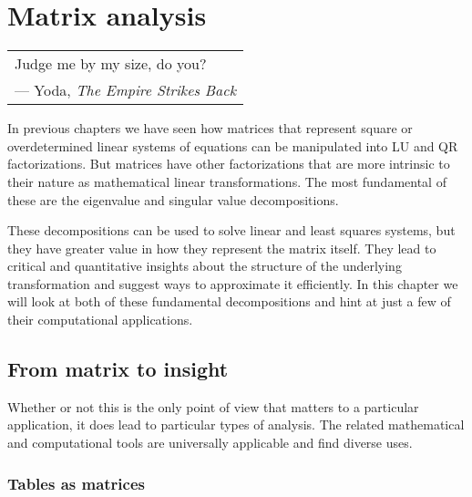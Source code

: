 \chapter{Matrix analysis}
\label{cha:matrixanaly}

\graphicspath{{matrixanaly/figures/}{matrixanaly/examples/}}

\begin{flushright}
  \small \sf
  \begin{tabular}{p{3in}}

    Judge me by my size, do you?\\ \hfill --- Yoda, \textit{The Empire Strikes Back} \index{Yoda} \index{The Empire Strikes Back}
  \end{tabular}
\end{flushright}


In previous chapters we have seen how matrices that represent square or overdetermined linear systems of equations can be manipulated into LU and QR factorizations. But matrices have other factorizations that are more intrinsic to their nature as mathematical linear transformations. The most fundamental of these are the eigenvalue and singular value decompositions.

These decompositions can be used to solve linear and least squares systems, but they have greater value in how they represent the matrix itself. They lead to critical and quantitative insights about the structure of the underlying transformation and suggest ways to approximate it efficiently. In this chapter we will look at both of these fundamental decompositions and hint at just a few of their computational applications.

\newpage

\section{From matrix to insight}
\label{sec:matrix-insight}

 Whether or not this is the only point of view that matters to a particular application, it does lead to particular types of analysis. The related mathematical and computational tools are universally applicable and find diverse uses.

\subsection{Tables as matrices}

